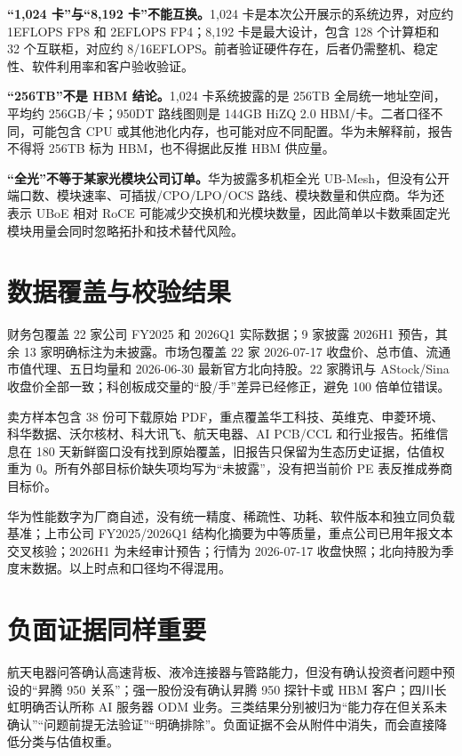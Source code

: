 \textbf{“1,024 卡”与“8,192 卡”不能互换。}1,024 卡是本次公开展示的系统边界，对应约 1EFLOPS FP8 和 2EFLOPS FP4；8,192 卡是最大设计，包含 128 个计算柜和 32 个互联柜，对应约 8/16EFLOPS。前者验证硬件存在，后者仍需整机、稳定性、软件利用率和客户验收验证。

\textbf{“256TB”不是 HBM 结论。}1,024 卡系统披露的是 256TB 全局统一地址空间，平均约 256GB/卡；950DT 路线图则是 144GB HiZQ 2.0 HBM/卡。二者口径不同，可能包含 CPU 或其他池化内存，也可能对应不同配置。华为未解释前，报告不得将 256TB 标为 HBM，也不得据此反推 HBM 供应量。

\textbf{“全光”不等于某家光模块公司订单。}华为披露多机柜全光 UB-Mesh，但没有公开端口数、模块速率、可插拔/CPO/LPO/OCS 路线、模块数量和供应商。华为还表示 UBoE 相对 RoCE 可能减少交换机和光模块数量，因此简单以卡数乘固定光模块用量会同时忽略拓扑和技术替代风险。

\section{数据覆盖与校验结果}

财务包覆盖 22 家公司 FY2025 和 2026Q1 实际数据；9 家披露 2026H1 预告，其余 13 家明确标注为未披露。市场包覆盖 22 家 2026-07-17 收盘价、总市值、流通市值代理、五日均量和 2026-06-30 最新官方北向持股。22 家腾讯与 AStock/Sina 收盘价全部一致；科创板成交量的“股/手”差异已经修正，避免 100 倍单位错误。

卖方样本包含 38 份可下载原始 PDF，重点覆盖华工科技、英维克、申菱环境、科华数据、沃尔核材、科大讯飞、航天电器、AI PCB/CCL 和行业报告。拓维信息在 180 天新鲜窗口没有找到原始覆盖，旧报告只保留为生态历史证据，估值权重为 0。所有外部目标价缺失项均写为“未披露”，没有把当前价 PE 表反推成券商目标价。

\begin{sourcequalitybox}[数据质量边界]
华为性能数字为厂商自述，没有统一精度、稀疏性、功耗、软件版本和独立同负载基准；上市公司 FY2025/2026Q1 结构化摘要为中等质量，重点公司已用年报文本交叉核验；2026H1 为未经审计预告；行情为 2026-07-17 收盘快照；北向持股为季度末数据。以上时点和口径均不得混用。
\end{sourcequalitybox}

\section{负面证据同样重要}

航天电器问答确认高速背板、液冷连接器与管路能力，但没有确认投资者问题中预设的“昇腾 950 关系”；强一股份没有确认昇腾 950 探针卡或 HBM 客户；四川长虹明确否认所称 AI 服务器 ODM 业务。三类结果分别被归为“能力存在但关系未确认”“问题前提无法验证”“明确排除”。负面证据不会从附件中消失，而会直接降低分类与估值权重。
